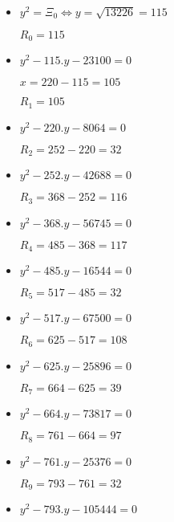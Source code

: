 \documentclass{article}
\begin{document}
\begin{itemize}
	\item \begin{flushleft}
		$ y^{2}=\Xi_{0} \iff y=\sqrt{13226}=115$
		
	$R_{0}=115$
	\end{flushleft}
	\item \begin{flushleft}
	$ y^{2}-115.y-23100=0$
	
	$x=220-115=105$
	
	$R_{1}=105$
\end{flushleft}
	\item \begin{flushleft}
	$ y^{2}-220.y-8064=0$
	
	$R_{2}=252-220=32$
\end{flushleft}
\item \begin{flushleft}
$ y^{2}-252.y-42688=0$

$R_{3}=368-252=116$
\end{flushleft}
\item \begin{flushleft}
	$ y^{2}-368.y-56745=0$
	
	$R_{4}=485-368=117$
\end{flushleft}
\item \begin{flushleft}
	$ y^{2}-485.y-16544=0$
	
	$R_{5}=517-485=32$
\end{flushleft}
\item \begin{flushleft}
	$ y^{2}-517.y-67500=0$
	
	$R_{6}=625-517=108$
\end{flushleft}
\item \begin{flushleft}
	$ y^{2}-625.y-25896=0$
	
	$R_{7}=664-625=39$
\end{flushleft}
\item \begin{flushleft}
	$ y^{2}-664.y-73817=0$
	
	$R_{8}=761-664=97$
\end{flushleft}
\item \begin{flushleft}
	$ y^{2}-761.y-25376=0$
	
	$R_{9}=793-761=32$
\end{flushleft}
\item \begin{flushleft}
	$ y^{2}-793.y-105444=0$
	

\end{flushleft}
\end{itemize}
\end{document}
